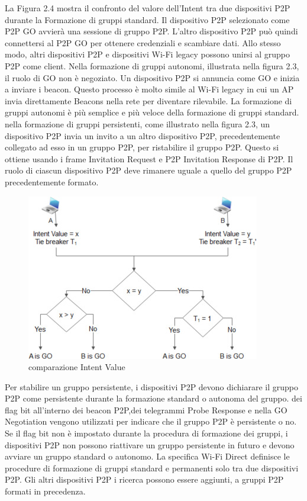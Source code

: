 La Figura 2.4 mostra il confronto del valore
dell'Intent tra due dispositivi P2P durante la Formazione di gruppi
standard. Il dispositivo P2P selezionato come P2P GO avvierà una
sessione di gruppo P2P. L'altro dispositivo P2P può quindi
connettersi al P2P GO per ottenere credenziali e scambiare
dati. Allo stesso modo, altri dispositivi P2P e dispositivi
Wi-Fi legacy possono unirsi al gruppo P2P come client. Nella
formazione di gruppi autonomi, illustrata nella figura 2.3,
il ruolo di GO non è negoziato. Un dispositivo P2P
si annuncia come GO e inizia a inviare i beacon. Questo
processo è molto simile al Wi-Fi legacy in cui un AP
invia direttamente Beacons nella rete per diventare
rilevabile. La formazione di gruppi autonomi è più
semplice e più veloce della formazione di gruppi
standard. nella formazione di gruppi persistenti, come illustrato
nella figura 2.3, un dispositivo P2P invia un invito
a un altro dispositivo P2P, precedentemente collegato
ad esso in un gruppo P2P, per ristabilire il gruppo P2P.
Questo si ottiene usando i frame Invitation Request e P2P
Invitation Response di P2P. Il ruolo di ciascun dispositivo
P2P deve rimanere uguale a quello del gruppo P2P precedentemente
formato.
\begin{figure}
\centering
\caption{comparazione Intent Value}
\includegraphics[width=0.9\columnwidth]{imgs/intentValueComparison.jpg} %

\end{figure}
Per stabilire un gruppo persistente, i dispositivi P2P
devono dichiarare il gruppo P2P come persistente durante la formazione
standard o autonoma del gruppo.
dei flag bit all'interno dei beacon P2P,dei telegrammi Probe
Response e nella GO Negotiation vengono utilizzati
per indicare che il gruppo P2P è persistente o no.
Se il flag bit non è impostato durante la procedura di formazione dei
gruppi, i dispositivi P2P non possono riattivare un gruppo persistente
in futuro e devono avviare un gruppo standard o autonomo. La specifica
Wi-Fi Direct \cite{alliance2016wi} definisce le procedure di formazione di
gruppi standard
e permanenti solo tra due dispositivi P2P. Gli altri dispositivi P2P i ricerca
possono essere aggiunti, a gruppi P2P formati in precedenza.



